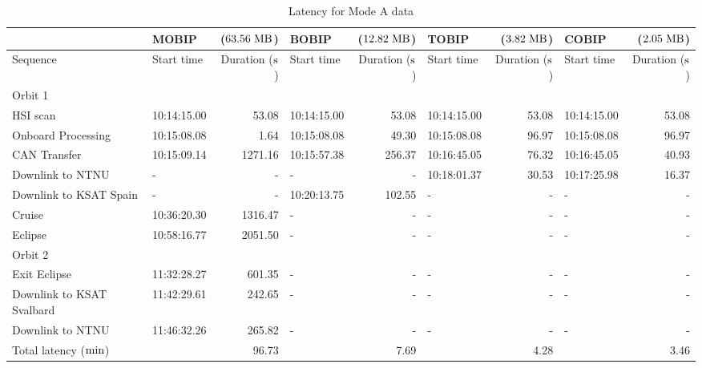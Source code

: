 \begin{table}[htbp]
	\caption{Latency for Mode A data}
	\label{tab:scenario-2b}
	\centering
	\begin{tabular}{l | l r |l  r|l r|l r}
	    \hline
         & MOBIP & ($63.56 \hspace{3pt} \rm{MB}$) & BOBIP  & ($12.82 \hspace{3pt} \rm{MB}$) & TOBIP & ($3.82 \hspace{3pt} \rm{MB}$) & COBIP & ($2.05 \hspace{3pt} \rm{MB}$) \\		
        \hline
        Sequence & Start time & Duration ($\rm{s}$) & Start time & Duration ($\rm{s}$) & Start time & Duration ($\rm{s}$) & Start time & Duration ($\rm{s}$) \\	
        \hline
        Orbit 1 & & & & & & & & \\
        \hline
    	HSI scan & 10:14:15.00 & 53.08 & 10:14:15.00 & 53.08 & 10:14:15.00 & 53.08 & 10:14:15.00 & 53.08 \\
    	Onboard Processing & 10:15:08.08 &  1.64 & 10:15:08.08 & 49.30 & 10:15:08.08 & 96.97 & 10:15:08.08 & 96.97  \\
    	CAN Transfer & 10:15:09.14 & 1271.16 & 10:15:57.38 & 256.37 & 10:16:45.05 & 76.32 & 10:16:45.05 & 40.93 \\
        Downlink to NTNU & - & - & - & - & 10:18:01.37 & 30.53 & 10:17:25.98 & 16.37 \\
        Downlink to KSAT Spain & - & - & 10:20:13.75 & 102.55 & - & - & - & - \\
        Cruise & 10:36:20.30 & 1316.47 & - & - &- & - & - & - \\
        Eclipse & 10:58:16.77 & 2051.50 & - & - &-  & - & - & - \\
        \hline
        Orbit 2 & & & & & & & & \\
        \hline
        Exit Eclipse & 11:32:28.27 & 601.35 & - & - & - & - & - & - \\
        Downlink to KSAT Svalbard & 11:42:29.61 & 242.65 & - & - & - & - & - & - \\
        Downlink to NTNU & 11:46:32.26	& 265.82 & - & - & - & - & - & - \\
        \hline
        Total latency ($\rm{min}$) & & 96.73 & & 7.69 & & 4.28 & & 3.46 \\
        \hline
    \end{tabular}
\end{table}
